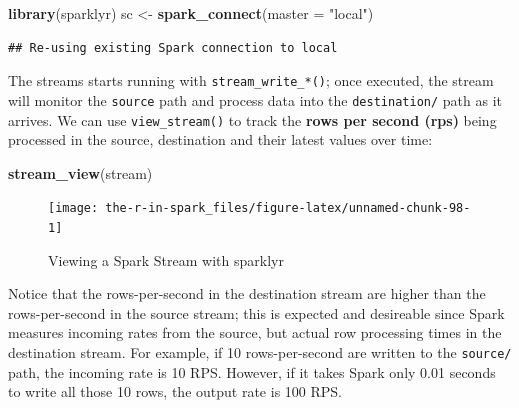 \documentclass[]{book}
\newenvironment{Shaded}{\begin{snugshade}}{\end{snugshade}}
\newcommand{\DataTypeTok}[1]{\textcolor[rgb]{0.13,0.29,0.53}{#1}}
\newcommand{\KeywordTok}[1]{\textcolor[rgb]{0.13,0.29,0.53}{\textbf{#1}}}
\newcommand{\NormalTok}[1]{#1}
\newcommand{\OperatorTok}[1]{\textcolor[rgb]{0.81,0.36,0.00}{\textbf{#1}}}
\newcommand{\StringTok}[1]{\textcolor[rgb]{0.31,0.60,0.02}{#1}}
\theoremstyle{definition}
\theoremstyle{definition}
\theoremstyle{definition}
\theoremstyle{remark}
\begin{document}
\begin{Shaded}
\begin{Highlighting}[]
\KeywordTok{library}\NormalTok{(sparklyr)}
\NormalTok{sc <-}\StringTok{ }\KeywordTok{spark_connect}\NormalTok{(}\DataTypeTok{master =} \StringTok{"local"}\NormalTok{)}
\end{Highlighting}
\end{Shaded}

\begin{verbatim}
## Re-using existing Spark connection to local
\end{verbatim}

\begin{Shaded}
\end{Shaded}

The streams starts running with \texttt{stream\_write\_*()}; once
executed, the stream will monitor the \texttt{source} path and process
data into the \texttt{destination/} path as it arrives. We can use
\texttt{view\_stream()} to track the \textbf{rows per second (rps)}
being processed in the source, destination and their latest values over
time:

\begin{Shaded}
\begin{Highlighting}[]
\KeywordTok{stream_view}\NormalTok{(stream)}
\end{Highlighting}
\end{Shaded}

\begin{figure}

{\centering \texttt{[image: the-r-in-spark\_files/figure-latex/unnamed-chunk-98-1]} 

}

\caption{Viewing a Spark Stream with sparklyr}\label{fig:unnamed-chunk-98}
\end{figure}

Notice that the rows-per-second in the destination stream are higher
than the rows-per-second in the source stream; this is expected and
desireable since Spark measures incoming rates from the source, but
actual row processing times in the destination stream. For example, if
10 rows-per-second are written to the \texttt{source/} path, the
incoming rate is 10 RPS. However, if it takes Spark only 0.01 seconds to
write all those 10 rows, the output rate is 100 RPS.
\end{document}
